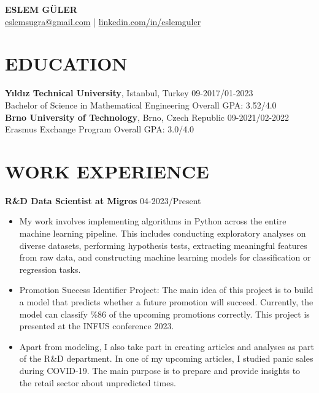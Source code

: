 \documentclass[a4paper,9pt]{extarticle}
\begin{document}
\pagestyle{empty}

\begin{center}
\textbf{\Large ESLEM GÜLER}\\[2pt] %
\href{mailto:example@example.com}{eslemsugra@gmail.com} | \href{https://www.linkedin.com/in/johndoe}{linkedin.com/in/eslemguler} %
\end{center}

\section*{EDUCATION}
\noindent
\textbf{Yıldız Technical University}, Istanbul, Turkey \hfill 09-2017/01-2023\\ %
Bachelor of Science in Mathematical Engineering \hfill Overall GPA: 3.52/4.0\\ %
\textbf{Brno University of Technology}, Brno, Czech Republic \hfill 09-2021/02-2022\\ %
Erasmus Exchange Program \hfill Overall GPA: 3.0/4.0 %
\section*{WORK EXPERIENCE}
\noindent
\textbf{R\&D Data Scientist at Migros} \hfill 04-2023/Present 
\begin{itemize}
\item My work involves implementing algorithms in Python across the entire machine learning pipeline. This includes conducting exploratory analyses on diverse datasets, performing hypothesis tests, extracting meaningful features from raw data, and constructing machine learning models for classification or regression tasks.
    \item Promotion Success Identifier Project: The main idea of this project is to build a model that predicts whether a future promotion will succeed. Currently, the model can classify \%86 of the upcoming promotions correctly. This project is presented at the INFUS conference 2023.
    \item Apart from modeling, I also take part in creating articles and analyses as part of the R\&D department. In one of my upcoming articles, I studied panic sales during COVID-19. The main purpose is to prepare and provide insights to the retail sector about unpredicted times.
\end{itemize}
\end{document}
